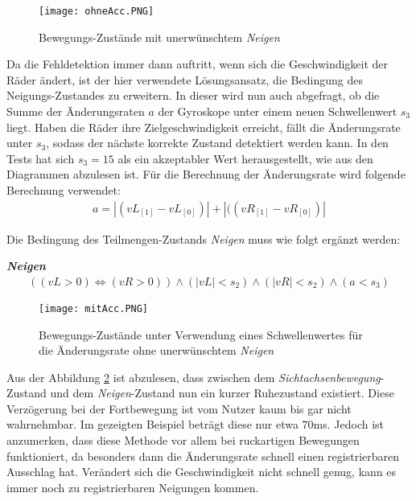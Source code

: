 \begin{figure}[h]
    \centering
    \texttt{[image: ohneAcc.PNG]}
    \caption{Bewegungs-Zustände mit unerwünschtem \textit{Neigen}}
    \label{fig:ohneAcc}
\end{figure}

Da die Fehldetektion immer dann auftritt, wenn sich die Geschwindigkeit der Räder ändert, ist der hier verwendete Lösungsansatz, die Bedingung des Neigungs-Zustandes zu erweitern.
In dieser wird nun auch abgefragt, ob die Summe der Änderungsraten $a$ der Gyroskope unter einem neuen Schwellenwert $s_3$ liegt.
Haben die Räder ihre Zielgeschwindigkeit erreicht, fällt die Änderungsrate unter $s_3$, sodass der nächste korrekte Zustand detektiert werden kann.
In den Tests hat sich $s_3 = 15$ als ein akzeptabler Wert herausgestellt, wie aus den Diagrammen abzulesen ist.
Für die Berechnung der Änderungsrate wird folgende Berechnung verwendet:
\begin{align}
    a = |(vL_{[1]} - vL_{[0]})| + |((vR_{[1]} - vR_{[0]})|
\end{align}

Die Bedingung des Teilmengen-Zustands \textit{Neigen} muss wie folgt ergänzt werden:

\textbf{\textit{Neigen}}
\begin{align}
    ((vL > 0) \Leftrightarrow (vR > 0)) \land (|vL| < s_2) \land (|vR| < s_2) \land (a < s_3)
\end{align}


\begin{figure}[h]
    \centering
    \texttt{[image: mitAcc.PNG]}
    \caption{Bewegungs-Zustände unter Verwendung eines Schwellenwertes für die Änderungsrate ohne unerwünschtem \textit{Neigen}}
    \label{fig:mitAcc}
\end{figure}

Aus der Abbildung \ref{fig:mitAcc} ist abzulesen, dass zwischen dem \textit{Sichtachsenbewegung}-Zustand und dem \textit{Neigen}-Zustand nun ein kurzer Ruhezustand existiert.
Diese Verzögerung bei der Fortbewegung ist vom Nutzer kaum bis gar nicht wahrnehmbar.
Im gezeigten Beispiel beträgt diese nur etwa 70ms.
Jedoch ist anzumerken, dass diese Methode vor allem bei ruckartigen Bewegungen funktioniert, da besonders dann die Änderungsrate schnell einen registrierbaren Ausschlag hat.
Verändert sich die Geschwindigkeit nicht schnell genug, kann es immer noch zu registrierbaren Neigungen kommen.

